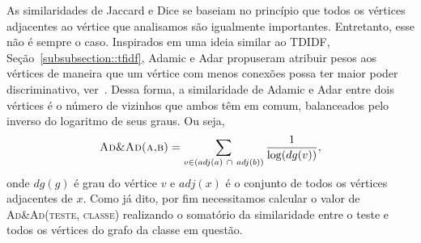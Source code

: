 As similaridades de Jaccard e Dice se baseiam no princípio que todos os vértices adjacentes ao vértice que analisamos são igualmente importantes. Entretanto, esse não é sempre o caso.
Inspirados em uma ideia similar ao TDIDF, Seção~\ref{subsubsection::tfidf}, Adamic e Adar propuseram atribuir pesos aos vértices de maneira que um vértice com menos conexões possa ter maior poder discriminativo, ver~\cite{Adamic03}. Dessa forma, a similaridade de Adamic e Adar entre dois vértices é o número de vizinhos que ambos têm em comum, balanceados pelo inverso do logaritmo de seus graus. Ou seja,
\begin{equation}
\textsc{Ad\&Ad(a,b)} =  \sum\limits_{v \in (adj(a)\ \cap\ adj(b))} \frac{1}{ \log(dg(v))},
\end{equation}
onde $dg(g)$ é grau do vértice $v$ e $adj(x)$ é o conjunto de todos os vértices adjacentes de $x$. Como já dito, por fim necessitamos calcular o valor de \textsc{Ad\&Ad(teste, classe)} realizando o somatório da similaridade entre o teste e todos os vértices do grafo da classe em questão.





